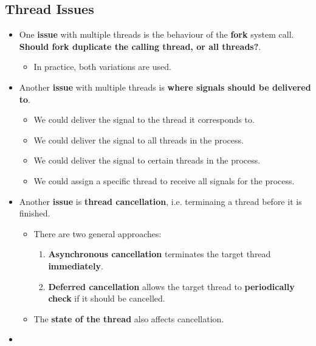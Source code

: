 \documentclass{article}
\begin{document}
\subsection*{Thread Issues}
\begin{itemize}
    \item One \textbf{issue} with multiple threads is the behaviour of the \textbf{fork} system call. \textbf{Should fork duplicate the calling thread, or all threads?}.
    \begin{itemize}
        \item In practice, both variations are used.
    \end{itemize}
    \item Another \textbf{issue} with multiple threads is \textbf{where signals should be delivered to}.
    \begin{itemize}
        \item We could deliver the signal to the thread it corresponds to.
        \item We could deliver the signal to all threads in the process.
        \item We could deliver the signal to certain threads in the process.
        \item We could assign a specific thread to receive all signals for the process.
    \end{itemize}
    \item Another \textbf{issue} is \textbf{thread cancellation}, i.e. terminaing a thread before it is finished.
    \begin{itemize}
        \item There are two general approaches:
        \begin{enumerate}
            \item \textbf{Asynchronous cancellation} terminates the target thread \textbf{immediately}.
            \item \textbf{Deferred cancellation} allows the target thread to \textbf{periodically check} if it should be cancelled.
        \end{enumerate}
        \item The \textbf{state of the thread} also affects cancellation.
    \end{itemize}
    \item 
\end{itemize}
\end{document}
